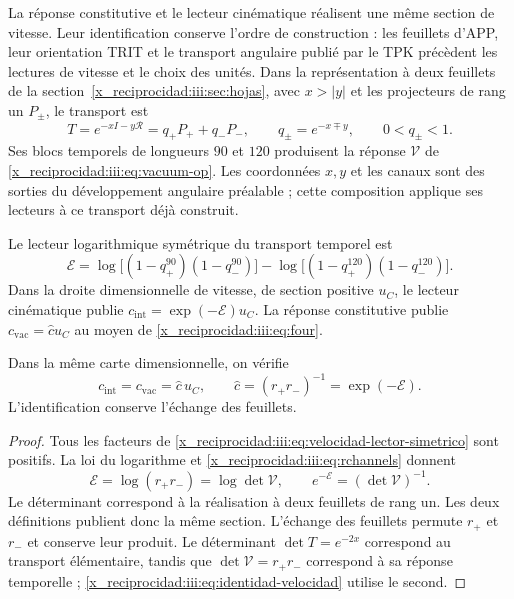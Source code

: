 La réponse constitutive et le lecteur cinématique réalisent une même
section de vitesse. Leur identification conserve l’ordre de construction :
les feuillets d’APP, leur orientation TRIT et le transport angulaire publié
par le TPK précèdent les lectures de vitesse et le choix des unités.
Dans la représentation à deux feuillets de la
section~\ref{x_reciprocidad:iii:sec:hojas}, avec $x>|y|$ et les projecteurs de rang un
$P_\pm$, le transport est
\[
 T=e^{-xI-y\mathcal R}=q_+P_++q_-P_-,
 \qquad q_\pm=e^{-x\mp y},\qquad 0<q_\pm<1.
\]
Ses blocs temporels de longueurs $90$ et $120$ produisent la réponse
$\mathcal V$ de \eqref{x_reciprocidad:iii:eq:vacuum-op}. Les coordonnées $x,y$ et les
canaux sont des sorties du développement angulaire préalable ; cette composition
applique ses lecteurs à ce transport déjà construit.

Le lecteur logarithmique symétrique du transport temporel est
\begin{equation}
 \mathcal E=
 \log\!\bigl[(1-q_+^{90})(1-q_-^{90})\bigr]
 -\log\!\bigl[(1-q_+^{120})(1-q_-^{120})\bigr].
 \label{x_reciprocidad:iii:eq:velocidad-lector-simetrico}
\end{equation}
Dans la droite dimensionnelle de vitesse, de section positive $u_C$, le
lecteur cinématique publie $c_{\mathrm{int}}=\exp(-\mathcal E)u_C$.
La réponse constitutive publie
$c_{\mathrm{vac}}=\widehat c u_C$ au moyen de \eqref{x_reciprocidad:iii:eq:four}.

\begin{proposition}
\label{x_reciprocidad:iii:prop:identidad-velocidad}
Dans la même carte dimensionnelle, on vérifie
\begin{equation}
 c_{\mathrm{int}}=c_{\mathrm{vac}}=\widehat c\,u_C,
 \qquad \widehat c=(r_+r_-)^{-1}=\exp(-\mathcal E).
 \label{x_reciprocidad:iii:eq:identidad-velocidad}
\end{equation}
L'identification conserve l'échange des feuillets.
\end{proposition}
\begin{proof}
Tous les facteurs de \eqref{x_reciprocidad:iii:eq:velocidad-lector-simetrico} sont
positifs. La loi du logarithme et \eqref{x_reciprocidad:iii:eq:rchannels} donnent
\[
 \mathcal E=\log(r_+r_-)=\log\det\mathcal V,
 \qquad e^{-\mathcal E}=(\det\mathcal V)^{-1}.
\]
Le déterminant correspond à la réalisation à deux feuillets de rang un.
Les deux définitions publient donc la même section. L’échange
des feuillets permute $r_+$ et $r_-$ et conserve leur produit. Le déterminant
$\det T=e^{-2x}$ correspond au transport élémentaire, tandis que
$\det\mathcal V=r_+r_-$ correspond à sa réponse temporelle ;
\eqref{x_reciprocidad:iii:eq:identidad-velocidad} utilise le second.
\end{proof}

